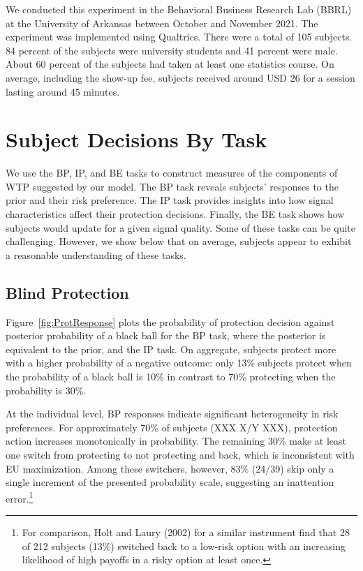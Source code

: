 \documentclass[12pt,a4paper]{article}
\newcommand{\agt}[1]{{\color{OliveGreen}#1}}
\begin{document}

We conducted this experiment in the Behavioral Business Research Lab (BBRL) at the University of Arkansas between October and November 2021.  The experiment was implemented using Qualtrics. There were a total of 105 subjects. 84 percent of the subjects were university students and 41 percent were male.  About 60 percent of the subjects had taken at least one statistics course. On average, including the show-up fee, subjects received around USD 26 for a session lasting around 45 minutes.  


\vspace{20pt}
\section{Subject Decisions By Task}\label{sec:sanity}

We use the BP, IP, and BE tasks to construct measures of the components of WTP suggested by our model. The BP task reveals subjects' responses to the prior and their risk preference. The IP task provides insights into how signal characteristics affect their protection decisions. Finally, the BE task shows how subjects would update for a given signal quality. Some of these tasks can be quite challenging. However, we show below that on average, subjects appear to exhibit a reasonable understanding of these tasks.

\subsection{Blind Protection}

Figure~\ref{fig:ProtResponse} plots the probability of protection decision against posterior probability of a black ball for the BP task, where the posterior is equivalent to the prior, and the IP task. On aggregate, subjects protect more with a higher probability of a negative outcome: only 13\% subjects protect when the probability of a black ball is 10\% in contrast to 70\% protecting when the probability is 30\%. 

At the individual level, BP responses indicate significant heterogeneity in risk preferences. For approximately 70\% of subjects (\agt{XXX X/Y XXX}), protection action increases monotonically in probability. The remaining 30\% make at least one switch from protecting to not protecting and back, which is inconsistent with EU maximization. Among these switchers, however, 83\% (24/39) skip only a single increment of the presented probability scale, suggesting an inattention error.\footnote{For comparison, Holt and Laury (2002) for a similar instrument find that 28 of 212 subjects (13\%) switched back to a low-risk option with an increasing likelihood of high payoffs in a risky option at least once.} 
\end{document}
